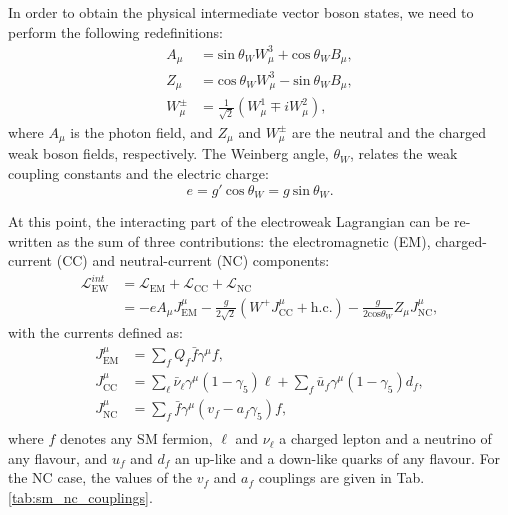 In order to obtain the physical intermediate vector boson states, we need to perform the following redefinitions:
\begin{equation}
	\begin{split}
		A_{\mu} &= \mathrm{sin}~\theta_{W} W^{3}_{\mu} + \mathrm{cos}~\theta_{W} B_{\mu},\\
		Z_{\mu} &= \mathrm{cos}~\theta_{W} W^{3}_{\mu} - \mathrm{sin}~\theta_{W} B_{\mu},\\
		W^{\pm}_{\mu} &= \frac{1}{\sqrt{2}}\left(W^{1}_{\mu} \mp i W^{2}_{\mu}\right),
	\end{split}
\end{equation}
where $A_{\mu}$ is the photon field, and $Z_{\mu}$ and $W^{\pm}_{\mu}$ are the neutral and the charged weak boson fields, respectively. The Weinberg angle, $\theta_{W}$, relates the weak coupling constants and the electric charge:
\begin{equation}
	e = g'~\mathrm{cos}~\theta_{W} = g~\mathrm{sin}~\theta_{W}.
\end{equation}

At this point, the interacting part of the electroweak Lagrangian can be re-written as the sum of three contributions: the electromagnetic (EM), charged-current (CC) and neutral-current (NC) components:
\begin{equation}
	\begin{split}
		\mathcal{L}^{int}_{\mathrm{EW}} &= \mathcal{L}_{\mathrm{EM}}+\mathcal{L}_{\mathrm{CC}}+\mathcal{L}_{\mathrm{NC}}\\
		&= -e A_{\mu} J^{\mu}_{\mathrm{EM}} - \frac{g}{2\sqrt{2}} \left(W^{+}J^{\mu}_{\mathrm{CC}} + \mathrm{h.c.}\right) - \frac{g}{2 \mathrm{cos}\theta_{W}} Z_{\mu} J^{\mu}_{\mathrm{NC}},
	\end{split}
\end{equation}
with the currents defined as:
\begin{equation}\label{2.8}
	\begin{split}
		J^{\mu}_{\mathrm{EM}} &= \sum_{f} Q_{f} \bar{f}\gamma^{\mu}f,\\
		J^{\mu}_{\mathrm{CC}} &= \sum_{\ell}\bar{\nu}_{\ell}\gamma^{\mu}(1-\gamma_{5})\ell + \sum_{f}\bar{u}_{f}\gamma^{\mu}(1-\gamma_{5})d_{f},\\
		J^{\mu}_{\mathrm{NC}} &= \sum_{f} \bar{f}\gamma^{\mu}(v_{f} - a_{f}\gamma_{5})f,\\
	\end{split}
\end{equation}
where $f$ denotes any SM fermion, $\ell$ and $\nu_{\ell}$ a charged lepton and a neutrino of any flavour, and $u_{f}$ and $d_{f}$ an up-like and a down-like quarks of any flavour. For the NC case, the values of the $v_{f}$ and $a_{f}$ couplings are given in Tab. \ref{tab:sm_nc_couplings}.

